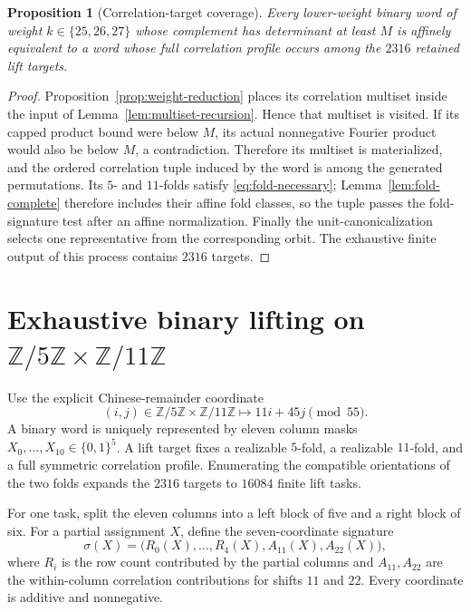 \documentclass[11pt,a4paper]{article}
\newtheorem{proposition}[theorem]{Proposition}
\theoremstyle{definition}
\theoremstyle{remark}
\newcommand{\Z}{\mathbb Z}
\begin{document}
\begin{proposition}[Correlation-target coverage]
\label{prop:target-coverage}
Every lower-weight binary word of weight $k\in\{25,26,27\}$ whose complement
has determinant at least $M$ is affinely equivalent to a word whose full
correlation profile occurs among the $2316$ retained lift targets.
\end{proposition}

\begin{proof}
Proposition~\ref{prop:weight-reduction} places its correlation multiset inside
the input of Lemma~\ref{lem:multiset-recursion}.  Hence that multiset is
visited.  If its capped product bound were below $M$, its actual nonnegative
Fourier product would also be below $M$, a contradiction.  Therefore its
multiset is materialized, and the ordered correlation tuple induced by the
word is among the generated permutations.  Its $5$- and $11$-folds satisfy
\eqref{eq:fold-necessary}; Lemma~\ref{lem:fold-complete} therefore includes
their affine fold classes, so the tuple passes the fold-signature test after an
affine normalization.  Finally the unit-canonicalization selects one
representative from the corresponding orbit.  The exhaustive finite output of
this process contains $2316$ targets.
\end{proof}

\section{Exhaustive binary lifting on \texorpdfstring{$\Z/5\Z\times\Z/11\Z$}{Z/5Z x Z/11Z}}
\label{sec:lifts}

Use the explicit Chinese-remainder coordinate
\[
  (i,j)\in\Z/5\Z\times\Z/11\Z
  \longmapsto 11i+45j\pmod{55}.
\]
A binary word is uniquely represented by eleven column masks
$X_0,\ldots,X_{10}\in\{0,1\}^5$.  A lift target fixes a realizable $5$-fold,
a realizable $11$-fold, and a full symmetric correlation profile.  Enumerating
the compatible orientations of the two folds expands the $2316$ targets to
$16084$ finite lift tasks.

For one task, split the eleven columns into a left block of five and a right
block of six.  For a partial assignment $X$, define the seven-coordinate
signature
\[
  \sigma(X)=\bigl(R_0(X),\ldots,R_4(X),A_{11}(X),A_{22}(X)\bigr),
\]
where $R_i$ is the row count contributed by the partial columns and
$A_{11},A_{22}$ are the within-column correlation contributions for shifts
$11$ and $22$.  Every coordinate is additive and nonnegative.
\end{document}
